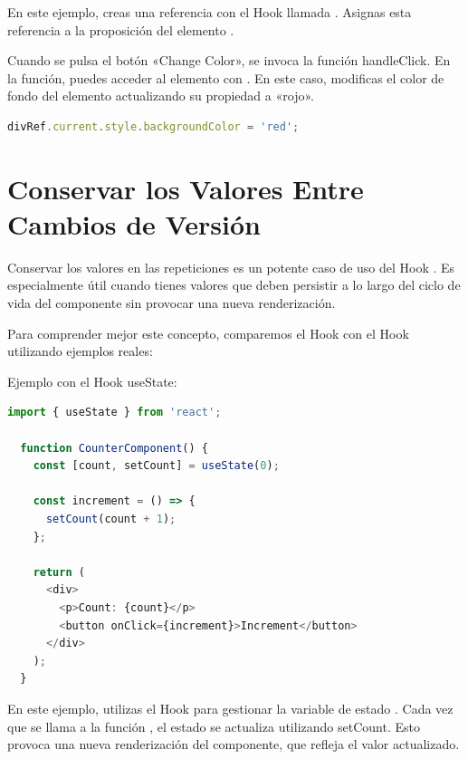En este ejemplo, creas una referencia con el Hook  llamada . Asignas esta referencia a la proposición  del elemento .

Cuando se pulsa el botón «Change Color», se invoca la función handleClick. En la función, puedes acceder al elemento  con . En este caso, modificas el color de fondo del elemento  actualizando su propiedad  a «rojo».
\vspace{0.2cm} %

\begin{lstlisting}[language=TypeScript, style=mystyle]
  divRef.current.style.backgroundColor = 'red';
\end{lstlisting}

\section*{Conservar los Valores Entre Cambios de Versión}

Conservar los valores en las repeticiones es un potente caso de uso del Hook . Es especialmente útil cuando tienes valores que deben persistir a lo largo del ciclo de vida del componente sin provocar una nueva renderización.

Para comprender mejor este concepto, comparemos el Hook  con el Hook  utilizando ejemplos reales:

Ejemplo con el Hook useState:
\vspace{0.2cm} %

\begin{lstlisting}[language=TypeScript, style=mystyle]
  import { useState } from 'react';

  function CounterComponent() {
    const [count, setCount] = useState(0);

    const increment = () => {
      setCount(count + 1);
    };

    return (
      <div>
        <p>Count: {count}</p>
        <button onClick={increment}>Increment</button>
      </div>
    );
  }
\end{lstlisting}

En este ejemplo, utilizas el Hook  para gestionar la variable de estado . Cada vez que se llama a la función , el estado  se actualiza utilizando setCount. Esto provoca una nueva renderización del componente, que refleja el valor  actualizado.
\vspace{0.2cm} %

